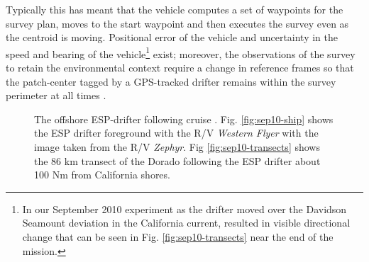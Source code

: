 Typically this has meant that the vehicle computes a set of waypoints
for the survey plan, moves to the start waypoint and then executes the
survey even as the centroid is moving. Positional error of the vehicle
and uncertainty in the speed and bearing of the vehicle\footnote{In
  our September 2010 experiment \cite{das11b} as the drifter moved
  over the Davidson Seamount \cite{clague10} deviation in the
  California current, resulted in visible directional change that can
  be seen in Fig. \ref{fig:sep10-transects} near the end of the
  mission.} exist; moreover, the observations of the survey to retain
the environmental context require a change in reference frames so that
the patch-center tagged by a GPS-tracked drifter remains within the
survey perimeter at all times \cite{das11b}.

\begin{figure}
\centering
{}
  \caption{\small{The offshore \can ESP-drifter following cruise
      \cite{das11b}. Fig. \ref{fig:sep10-ship} shows the ESP drifter
      foreground with the R/V \emph{Western Flyer} with the image
      taken from the R/V \emph{Zephyr}. Fig \ref{fig:sep10-transects}
      shows the 86 km transect of the Dorado following the ESP drifter
      about 100 Nm from California shores.}}
\label{fig:gulper}
\end{figure}


